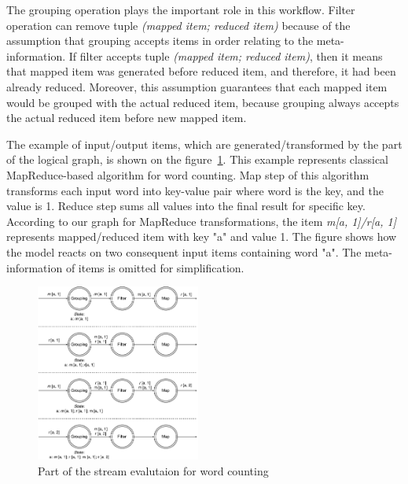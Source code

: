 The grouping operation plays the important role in this workflow. Filter operation can remove tuple {\it (mapped item; reduced item)} because of the assumption that grouping accepts items in order relating to the meta-information. If filter accepts tuple {\it (mapped item; reduced item)}, then it means that mapped item was generated before reduced item, and therefore, it had been already reduced. Moreover, this assumption guarantees that each mapped item would be grouped with the actual reduced item, because grouping always accepts the actual reduced item before new mapped item.

The example of input/output items, which are generated/transformed by the part of the logical graph, is shown on the figure~\ref {word-count-figure}. This example represents classical MapReduce-based algorithm for word counting. Map step of this algorithm transforms each input word into key-value pair where word is the key, and the value is 1. Reduce step sums all values into the final result for specific key. According to our graph for MapReduce transformations, the item {\it m[a, 1]/r[a, 1]} represents mapped/reduced item with key "a" and value 1. The figure shows how the model reacts on two consequent input items containing word "a". The meta-information of items is omitted for simplification.

\begin{figure}[htbp]
  \centering
  \includegraphics[width=0.48\textwidth]{pics/wordcount}
  \caption{Part of the stream evalutaion for word counting}
  \label {word-count-figure}
\end{figure}

